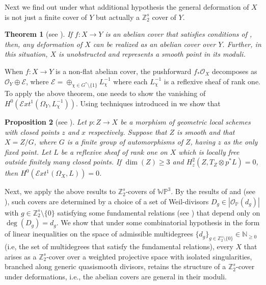 \documentclass[12pt,twoside,]{amsart}
\theoremstyle{plain}
\newtheorem{theorem}{Theorem}[subsection]
\newtheorem{proposition}[theorem]{Proposition}
\theoremstyle{definition}
\begin{document}
Next we find out under what additional hypothesis the general deformation of $X$ is not just a finite cover of $Y$ but actually a $\mathbb{Z}_2^s$ cover of $Y$. 

\begin{theorem}[see ]
  If $f: X \to Y$ is an abelian cover that satisfies conditions of , then, any deformation of $X$ can be realized as an abelian cover over $Y$. Further, in this situation, $X$ is unobstructed and represents a smooth point in its moduli.
\end{theorem}

When $f: X \to Y$ is a non-flat abelian cover, the pushforward $f_*\mathcal{O}_X$ decomposes as $\mathcal{O}_Y \oplus \mathcal{E}$, where $\mathcal{E} = \oplus_{\chi \in G^* \setminus \{1\}}L_{\chi}^{-1}$ where each $L_{\chi}^{-1}$ is a reflexive sheaf of rank one. To apply the above theorem, one needs to show the vanishing of $H^0(\mathcal{E}xt^1(\Omega_Y, L_{\chi}^{-1}))$. Using techniques introduced in \cite{schlessinger1971} we show that

\begin{proposition}[see ]\label{analog Schlessinger main intro}
    Let $p : Z \to X$ be a morphism of geometric local schemes with closed points $z$ and $x$ respectively. Suppose that $Z$ is smooth and that $X = Z/G$, where $G$ is a finite group of automorphisms of $Z$, having $z$ as the only fixed point. Let $L$ be a reflexive sheaf of rank one on $X$ which is locally free outside finitely many closed points. If $\operatorname{dim}(Z) \geq 3$ and $H_z^2(Z, T_Z \otimes p^*L) = 0$, then $H^0(\mathcal{E}xt^1(\Omega_X, L)) = 0$.
\end{proposition}

Next, we apply the above results to $\mathbb{Z}_2^s$-covers of $\mathbb{WP}^3$. By the results of \cite{pardini1991abelian} and \cite{AP12} (see ), such covers are determined by a choice of a set of Weil-divisors $D_g \in |\mathcal{O}_{\mathbb{P}}(d_g)|$ with $g \in \mathbb{Z}_2^s \setminus \{0\}$ satisfying some fundamental relations (see ) that depend only on $\operatorname{deg}(D_g) = d_g$. We show that under some combinatorial hypothesis in the form of linear inequalities on the space of admissible multidegrees $\{d_g\}_{g \in \mathbb{Z}_2^s \setminus \{0\}} \in \mathbb{N}_{\geq 0}$ (i.e, the set of multidegrees that satisfy the fundamental relations), every $X$ that arises as a $\mathbb{Z}_2^s$-cover over a weighted projective space with isolated singularities, branched along generic quasismooth divisors, retains the structure of a $\mathbb{Z}_2^s$-cover under deformations, i.e., the abelian covers are general in their moduli.
\end{document}

